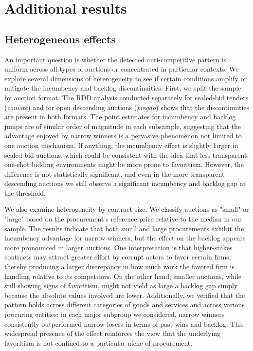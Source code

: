 \section{Additional results}\label{res_ar}
\subsection{Heterogeneous effects}
An important question is whether the detected anti-competitive pattern is uniform across all types of auctions or concentrated in particular contexts. We explore several dimensions of heterogeneity to see if certain conditions amplify or mitigate the incumbency and backlog discontinuities. First, we split the sample by auction format. The RDD analysis conducted separately for sealed-bid tenders (\emph{convite}) and for open descending auctions (\emph{pregão}) shows that the discontinuities are present in both formats. The point estimates for incumbency and backlog jumps are of similar order of magnitude in each subsample, suggesting that the advantage enjoyed by narrow winners is a pervasive phenomenon not limited to one auction mechanism. If anything, the incumbency effect is slightly larger in sealed-bid auctions, which could be consistent with the idea that less transparent, one-shot bidding environments might be more prone to favoritism. However, the difference is not statistically significant, and even in the more transparent descending auctions we still observe a significant incumbency and backlog gap at the threshold.

We also examine heterogeneity by contract size. We classify auctions as "small" or "large" based on the procurement's reference price relative to the median in our sample. The results indicate that both small and large procurements exhibit the incumbency advantage for narrow winners, but the effect on the backlog appears more pronounced in larger auctions. One interpretation is that higher-stakes contracts may attract greater effort by corrupt actors to favor certain firms, thereby producing a larger discrepancy in how much work the favored firm is handling relative to its competitors. On the other hand, smaller auctions, while still showing signs of favoritism, might not yield as large a backlog gap simply because the absolute values involved are lower. Additionally, we verified that the pattern holds across different categories of goods and services and across various procuring entities: in each major subgroup we considered, narrow winners consistently outperformed narrow losers in terms of past wins and backlog. This widespread presence of the effect reinforces the view that the underlying favoritism is not confined to a particular niche of procurement.

